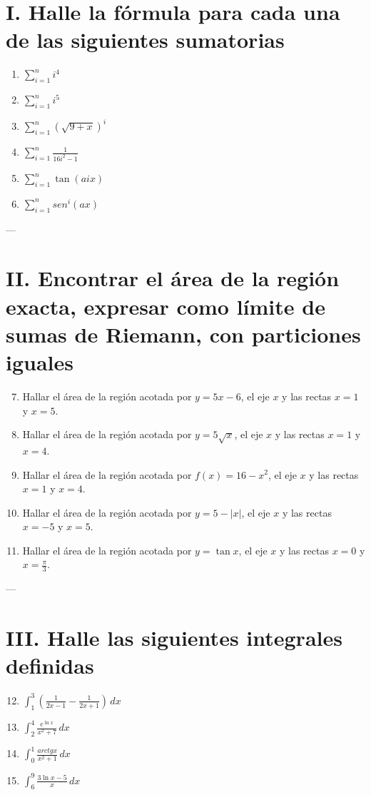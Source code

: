 \documentclass[12pt]{article}
\begin{document}
\section*{I. Halle la fórmula para cada una de las siguientes sumatorias}

\begin{enumerate}
\item $\displaystyle \sum_{i=1}^{n} i^4$
\item $\displaystyle \sum_{i=1}^{n} i^5$
\item $\displaystyle \sum_{i=1}^{n} \left(\sqrt{9+x}\right)^i$
\item $\displaystyle \sum_{i=1}^{n} \frac{1}{16i^2-1}$
\item $\displaystyle \sum_{i=1}^{n} \tan(aix)$
\item $\displaystyle \sum_{i=1}^{n} sen^i(ax)$
\end{enumerate}

---

\section*{II. Encontrar el área de la región exacta, expresar como límite de sumas de Riemann, con particiones iguales}

\begin{enumerate}
\setcounter{enumi}{6}
\item Hallar el área de la región acotada por $y=5x-6$, el eje $x$ y las rectas $x=1$ y $x=5$.
\item Hallar el área de la región acotada por $y=5\sqrt{x}$, el eje $x$ y las rectas $x=1$ y $x=4$.
\item Hallar el área de la región acotada por $f(x)=16-x^2$, el eje $x$ y las rectas $x=1$ y $x=4$.
\item Hallar el área de la región acotada por $y=5-|x|$, el eje $x$ y las rectas $x=-5$ y $x=5$.
\item Hallar el área de la región acotada por $y=\tan x$, el eje $x$ y las rectas $x=0$ y $x=\frac{\pi}{3}$.
\end{enumerate}

---

\section*{III. Halle las siguientes integrales definidas}

\begin{enumerate}
\setcounter{enumi}{11}
\item $\displaystyle \int_{1}^{3}\left(\frac{1}{2x-1}-\frac{1}{2x+1}\right)\,dx$
\item $\displaystyle \int_{2}^{4}\frac{e^{\ln x}}{x^2+7}\,dx$
\item $\displaystyle \int_{0}^{1}\frac{arctg x}{x^2+1}\,dx$
\item $\displaystyle \int_{6}^{9}\frac{3\ln x-5}{x}\,dx$
\end{enumerate}
\end{document}
